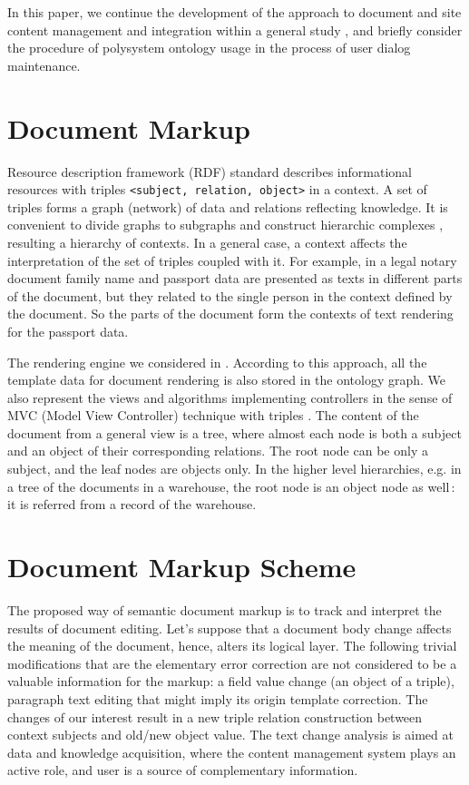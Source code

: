 \documentclass[conference]{IEEEtran}
\begin{document}
In this paper, we continue the development of the approach
\cite{prevwork} to document and site content management and
integration within a general study \cite{b2:15}, and briefly consider
the procedure of polysystem ontology usage in the process of user
dialog maintenance.

\section{Document Markup}

Resource description framework (RDF) standard describes informational
resources with triples \texttt{<subject, relation, object>} in a
context.  A set of triples forms a graph (network) of data and
relations reflecting knowledge.  It is convenient to divide graphs to
subgraphs and construct hierarchic complexes \cite{b2:15}, resulting a
hierarchy of contexts.  In a general case, a context affects the
interpretation of the set of triples coupled with it.  For example, in
a legal notary document family name and passport data are presented as
texts in different parts of the document, but they related to the
single person in the context defined by the document.  So the parts of
the document form the contexts of text rendering for the passport
data.

The rendering engine we considered in \cite{prevwork}.  According to
this approach, all the template data for document rendering is also
stored in the ontology graph.  We also represent the views and
algorithms implementing controllers in the sense of MVC (Model View
Controller) \cite{b2:5} technique with triples \cite{b5}.  The content
of the document from a general view is a tree, where almost each node
is both a subject and an object of their corresponding relations.  The
root node can be only a subject, and the leaf nodes are objects only.
In the higher level hierarchies, e.g. in a tree of the documents in a
warehouse, the root node is an object node as well\,: it is referred
from a record of the warehouse.

\section{Document Markup Scheme}
\label{sec:scheme}

The proposed way of semantic document markup is to track and interpret
the results of document editing.  Let's suppose that a document body
change affects the meaning of the document, hence, alters its logical
layer.  The following trivial modifications that are the elementary
error correction are not considered to be a valuable information for
the markup: a field value change (an object of a triple), paragraph
text editing that might imply its origin template correction.  The
changes of our interest result in a new triple relation construction
between context subjects and old/new object value.  The text change
analysis is aimed at data and knowledge acquisition, where the content
management system plays an active role, and user is a source of
complementary information.
\end{document}
